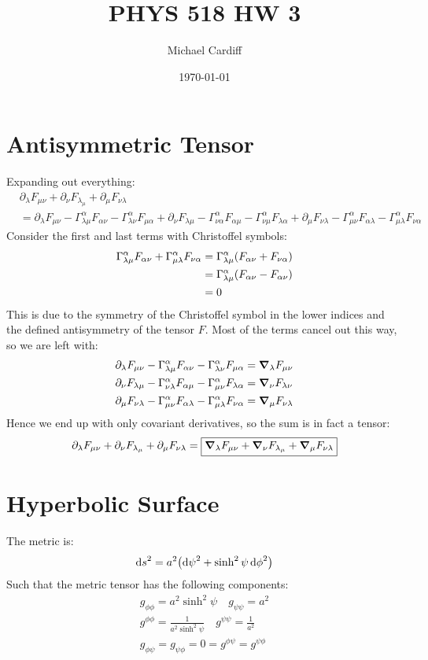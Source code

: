\documentclass[12pt]{article}
\title{\vspace{-3em}PHYS 518 HW 3}
\author{Michael Cardiff}
\date{\today}
\newcommand{\D}{\partial}
\newcommand{\h}{\phi}
\newcommand{\s}{\psi}
\begin{document}
\maketitle

\section{Antisymmetric Tensor}
Expanding out everything:
\begin{align*}
  &\D_\lambda F_{\mu\nu}+\D_\nu F_{\lambda_\mu}+\D_\mu F_{\nu\lambda}\\
  &=\D_\lambda F_{\mu\nu}-\Gamma^{\alpha}_{\lambda\mu}F_{\alpha\nu}
  -\Gamma^{\alpha}_{\lambda\nu}F_{\mu\alpha}+\D_\nu F_{\lambda\mu}
  -\Gamma^{\alpha}_{\nu\alpha}F_{\alpha\mu}-\Gamma^\alpha_{\nu\mu}F_{\lambda\alpha}
  +\D_\mu F_{\nu\lambda}-\Gamma^\alpha_{\mu\nu}F_{\alpha\lambda}
  -\Gamma^{\alpha}_{\mu\lambda}F_{\nu\alpha}
\end{align*}
Consider the first and last terms with Christoffel symbols:
\begin{align*}
  \Gamma^\alpha_{\lambda\mu}F_{\alpha\nu}+\Gamma^{\alpha}_{\mu\lambda}F_{\nu\alpha}
  &=\Gamma^\alpha_{\lambda\mu}\qty(F_{\alpha\nu}+F_{\nu\alpha})\\
  &=\Gamma^\alpha_{\lambda\mu}\qty(F_{\alpha\nu}-F_{\alpha\nu})\\
  &=0
\end{align*}
This is due to the symmetry of the Christoffel symbol in the lower indices and the defined antisymmetry of the tensor $F$. Most of the terms cancel out this way, so we are left with:
\begin{align*}
  \D_\lambda F_{\mu\nu}-\Gamma^{\alpha}_{\lambda\mu}F_{\alpha\nu}
  -\Gamma^{\alpha}_{\lambda\nu}F_{\mu\alpha}&=\grad_\lambda{F_{\mu\nu}}\\
  \D_\nu F_{\lambda\mu}-\Gamma^{\alpha}_{\nu\lambda}F_{\alpha\mu}
  -\Gamma^{\alpha}_{\mu\nu}F_{\lambda\alpha}&=\grad_\nu{F_{\lambda\nu}}\\
  \D_\mu F_{\nu\lambda}-\Gamma^{\alpha}_{\mu\nu}F_{\alpha\lambda}
  -\Gamma^{\alpha}_{\mu\lambda}F_{\nu\alpha}&=\grad_\mu{F_{\nu\lambda}}
\end{align*}
Hence we end up with only covariant derivatives, so the sum is in fact a tensor:
\begin{align*}
  \D_\lambda F_{\mu\nu}+\D_\nu F_{\lambda_\mu}+\D_\mu F_{\nu\lambda}
  =\boxed{
    \grad_\lambda F_{\mu\nu}+
    \grad_\nu F_{\lambda_\mu}+
    \grad_\mu F_{\nu\lambda}}
\end{align*}
\section{Hyperbolic Surface}
The metric is:
\begin{align*}
  \dd{s}^2=a^2\qty(\dd{\psi}^2+\sinh^2\psi\dd{\phi}^2)
\end{align*}
Such that the metric tensor has the following components:
\begin{gather*}
  g_{\phi\phi}=a^2\sinh^2\psi\quad g_{\s\s}=a^2\\
  g^{\phi\phi}=\frac{1}{a^2\sinh^2\psi}\quad g^{\s\s}=\frac{1}{a^2}\\
  g_{\h\s}=g_{\s\h}=0=g^{\h\s}=g^{\s\h}
\end{gather*}
\end{document}

